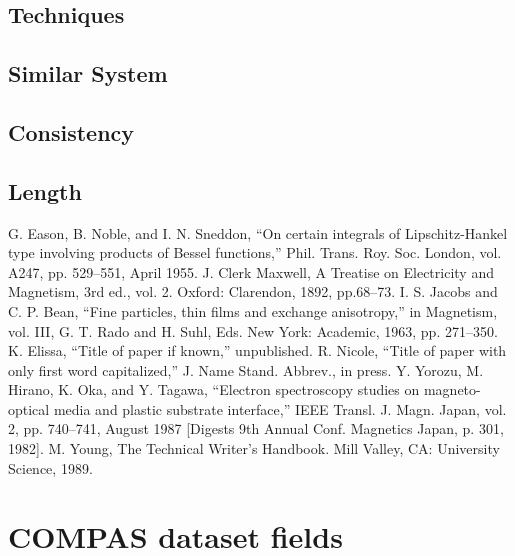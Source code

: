 \documentclass[conference]{IEEEtran}
\begin{document}
	\subsection{Techniques}
	
	\subsection{Similar System}
	
	\subsection{Consistency}
	
	\subsection{Length}
	
	
	
	\begin{thebibliography}{00}
		 G. Eason, B. Noble, and I. N. Sneddon, ``On certain integrals of Lipschitz-Hankel type involving products of Bessel functions,'' Phil. Trans. Roy. Soc. London, vol. A247, pp. 529--551, April 1955.
		 J. Clerk Maxwell, A Treatise on Electricity and Magnetism, 3rd ed., vol. 2. Oxford: Clarendon, 1892, pp.68--73.
		 I. S. Jacobs and C. P. Bean, ``Fine particles, thin films and exchange anisotropy,'' in Magnetism, vol. III, G. T. Rado and H. Suhl, Eds. New York: Academic, 1963, pp. 271--350.
		 K. Elissa, ``Title of paper if known,'' unpublished.
		 R. Nicole, ``Title of paper with only first word capitalized,'' J. Name Stand. Abbrev., in press.
		 Y. Yorozu, M. Hirano, K. Oka, and Y. Tagawa, ``Electron spectroscopy studies on magneto-optical media and plastic substrate interface,'' IEEE Transl. J. Magn. Japan, vol. 2, pp. 740--741, August 1987 [Digests 9th Annual Conf. Magnetics Japan, p. 301, 1982].
		 M. Young, The Technical Writer's Handbook. Mill Valley, CA: University Science, 1989.
	\end{thebibliography}


\onecolumn
\pagebreak
\appendix 
\section{COMPAS dataset fields}
\end{document}
